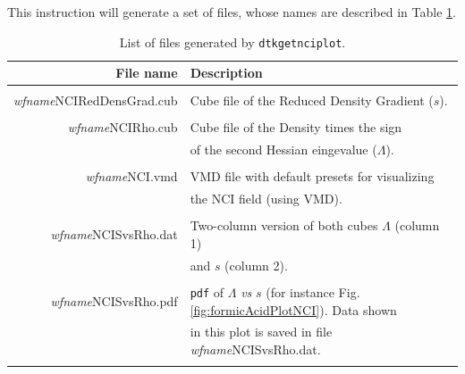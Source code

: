 This instruction will generate a set of files, whose names are described in
Table \ref{tab:ncilistfiles}.
\begin{table}[hbt!]
\footnotesize
\centering
\begin{tabular}{r ||l}
\hline 
\textbf{File name}  & \textbf{Description}   \\ \hline
 & \\
{\it wfname}NCIRedDensGrad.cub& Cube file of the Reduced Density Gradient ($s$). \\
 & \\
{\it wfname}NCIRho.cub& Cube file of the Density times the sign \\ 
                                 & of the second Hessian eingevalue ($\Lambda$). \\
 & \\
{\it wfname}NCI.vmd& VMD file with default presets for visualizing\\
                   & the NCI field (using VMD). \\
 & \\
 {\it wfname}NCISvsRho.dat& Two-column version of both cubes $\Lambda$ (column 1)\\
                                    & and $s$ (column 2).\\
 & \\
 {\it wfname}NCISvsRho.pdf& \texttt{pdf} of $\Lambda$ \textit{vs} $s$ (for instance
 Fig. \ref{fig:formicAcidPlotNCI}). Data shown\\ 
  & in this plot is saved in file {\it wfname}NCISvsRho.dat.\\
 & \\\hline
\end{tabular}
\caption{List of files generated by \texttt{dtkgetnciplot}.\label{tab:ncilistfiles}}
\end{table}

